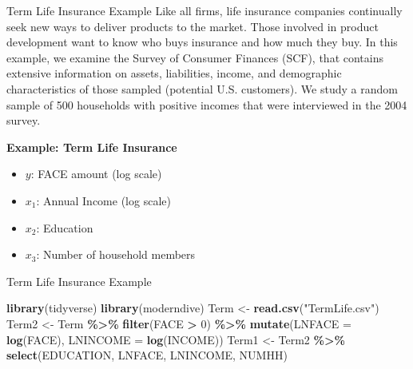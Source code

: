 \documentclass[
  ignorenonframetext,
]{beamer}
\newenvironment{Shaded}{\begin{snugshade}}{\end{snugshade}}
\newcommand{\AttributeTok}[1]{\textcolor[rgb]{0.13,0.29,0.53}{#1}}
\newcommand{\DecValTok}[1]{\textcolor[rgb]{0.00,0.00,0.81}{#1}}
\newcommand{\FunctionTok}[1]{\textcolor[rgb]{0.13,0.29,0.53}{\textbf{#1}}}
\newcommand{\NormalTok}[1]{#1}
\newcommand{\OtherTok}[1]{\textcolor[rgb]{0.56,0.35,0.01}{#1}}
\newcommand{\SpecialCharTok}[1]{\textcolor[rgb]{0.81,0.36,0.00}{\textbf{#1}}}
\newcommand{\StringTok}[1]{\textcolor[rgb]{0.31,0.60,0.02}{#1}}
\providecommand{\tightlist}{%
  \setlength{\itemsep}{0pt}\setlength{\parskip}{0pt}}
\begin{document}
\begin{frame}{Term Life Insurance Example}
\protect\hypertarget{term-life-insurance-example}{}
Like all firms, life insurance companies continually seek new ways to
deliver products to the market. Those involved in product development
want to know who buys insurance and how much they buy. In this example,
we examine the Survey of Consumer Finances (SCF), that contains
extensive information on assets, liabilities, income, and demographic
characteristics of those sampled (potential U.S. customers). We study a
random sample of 500 households with positive incomes that were
interviewed in the 2004 survey.

\textbf{Example: Term Life Insurance}

\begin{itemize}
\tightlist
\item
  \(y\): FACE amount (log scale)
\item
  \(x_1\): Annual Income (log scale)
\item
  \(x_2\): Education
\item
  \(x_3\): Number of household members
\end{itemize}
\end{frame}

\begin{frame}[fragile]{Term Life Insurance Example}
\protect\hypertarget{term-life-insurance-example-1}{}
\normalsize

\begin{Shaded}
\begin{Highlighting}[]
\FunctionTok{library}\NormalTok{(tidyverse)}
\FunctionTok{library}\NormalTok{(moderndive)}
\NormalTok{Term }\OtherTok{\textless{}{-}} \FunctionTok{read.csv}\NormalTok{(}\StringTok{"TermLife.csv"}\NormalTok{)}
\NormalTok{Term2 }\OtherTok{\textless{}{-}}\NormalTok{ Term }\SpecialCharTok{\%\textgreater{}\%} 
  \FunctionTok{filter}\NormalTok{(FACE }\SpecialCharTok{\textgreater{}} \DecValTok{0}\NormalTok{) }\SpecialCharTok{\%\textgreater{}\%} 
  \FunctionTok{mutate}\NormalTok{(}\AttributeTok{LNFACE =} \FunctionTok{log}\NormalTok{(FACE), }\AttributeTok{LNINCOME =} \FunctionTok{log}\NormalTok{(INCOME))}
\NormalTok{Term1 }\OtherTok{\textless{}{-}}\NormalTok{ Term2 }\SpecialCharTok{\%\textgreater{}\%} 
  \FunctionTok{select}\NormalTok{(EDUCATION, LNFACE, LNINCOME, NUMHH)}
\end{Highlighting}
\end{Shaded}

\normalsize
\end{frame}
\end{document}
